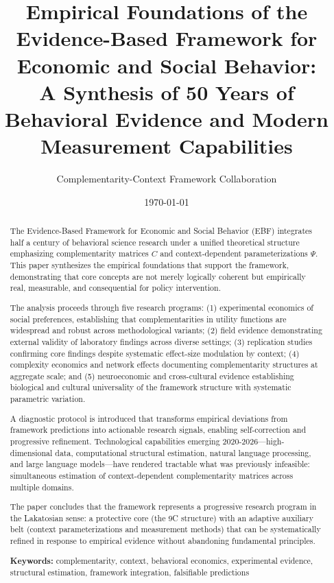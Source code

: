 \documentclass[12pt,oneside]{book}
\title{Empirical Foundations of the Evidence-Based Framework for Economic and Social Behavior:\\
       A Synthesis of 50 Years of Behavioral Evidence and Modern Measurement Capabilities}
\author{Complementarity-Context Framework Collaboration}
\date{\today}
\begin{document}
\maketitle

\begin{abstract}

The Evidence-Based Framework for Economic and Social Behavior (EBF) integrates half a century of
behavioral science research under a unified theoretical structure emphasizing complementarity matrices
$C$ and context-dependent parameterizations $\Psi$. This paper synthesizes the empirical foundations
that support the framework, demonstrating that core concepts are not merely logically coherent but
empirically real, measurable, and consequential for policy intervention.

The analysis proceeds through five research programs: (1) experimental economics of social preferences,
establishing that complementarities in utility functions are widespread and robust across methodological
variants; (2) field evidence demonstrating external validity of laboratory findings across diverse settings;
(3) replication studies confirming core findings despite systematic effect-size modulation by context;
(4) complexity economics and network effects documenting complementarity structures at aggregate scale;
and (5) neuroeconomic and cross-cultural evidence establishing biological and cultural universality of
the framework structure with systematic parametric variation.

A diagnostic protocol is introduced that transforms empirical deviations from framework predictions
into actionable research signals, enabling self-correction and progressive refinement. Technological
capabilities emerging 2020-2026—high-dimensional data, computational structural estimation, natural
language processing, and large language models—have rendered tractable what was previously infeasible:
simultaneous estimation of context-dependent complementarity matrices across multiple domains.

The paper concludes that the framework represents a progressive research program in the Lakatosian sense:
a protective core (the 9C structure) with an adaptive auxiliary belt (context parameterizations and
measurement methods) that can be systematically refined in response to empirical evidence without
abandoning fundamental principles.

\medskip

\noindent\textbf{Keywords:} complementarity, context, behavioral economics, experimental evidence,
structural estimation, framework integration, falsifiable predictions

\end{abstract}
\end{document}
